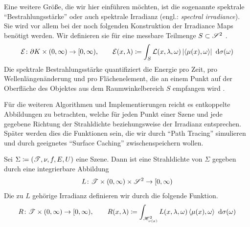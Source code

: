 		Eine weitere Größe, die wir hier einführen möchten, ist die sogenannte spektrale \enquote{Bestrahlungsstärke} oder auch spektrale Irradianz (engl.: \textit{spectral irradiance}).
		Sie wird vor allem bei der noch folgenden Konstruktion der Irradiance Maps benötigt werden.
		Wir definieren sie für eine messbare Teilmenge $S\subset\mathscr{S}^{2}$ \cite[S.~9~f]{guide-radiometry}.
		\[
			\mathcal{E}\colon\partial K\times (0,\infty)\to[0,\infty),\qquad \mathcal{E}(x,\lambda) \coloneqq \int_{S}^{}  \mathcal{L}(x,\lambda,\omega)\left\vert \left\langle \mu(x),\omega \right\rangle \right\vert \ \mathrm{d} \sigma(\omega)
		\]
		Die spektrale Bestrahlungsstärke quantifiziert die Energie pro Zeit, pro Wellenlängenänderung und pro Flächenelement, die an einem Punkt auf der Oberfläche des Objektes aus dem Raumwinkelbereich $S$ empfangen wird \cite{intro-radiometry,guide-radiometry}.

		Für die weiteren Algorithmen und Implementierungen reicht es entkoppelte Abbildungen zu betrachten, welche für jeden Punkt einer Szene und jede gegebene Richtung der Strahldichte beziehungsweise der Irradianz entsprechen.
		Später werden dies die Funktionen sein, die wir durch \enquote{Path Tracing} simulieren und durch geeignetes \enquote{Surface Caching} zwischenspeichern wollen.
		\begin{definition}
			Sei $\Sigma\coloneqq (\mathscr{T},\nu,f,E,U)$ eine Szene.
			Dann ist eine Strahldichte von $\Sigma$ gegeben durch eine integrierbare Abbildung
			\[
				L\colon\mathscr{T}\times(0,\infty)\times\mathscr{S}^{2}\to[0,\infty)
			\]
			Die zu $L$ gehörige Irradianz definieren wir durch die folgende Funktion.
			\[
				R\colon\mathscr{T}\times(0,\infty)\to[0,\infty),\qquad R(x,\lambda)\coloneqq \int_{\mathscr{H}^{2}_{\nu(x)}}^{} L(x,\lambda,\omega)\left\langle \mu(x),\omega \right\rangle\ \mathrm{d} \sigma(\omega)
			\]
		\end{definition}







